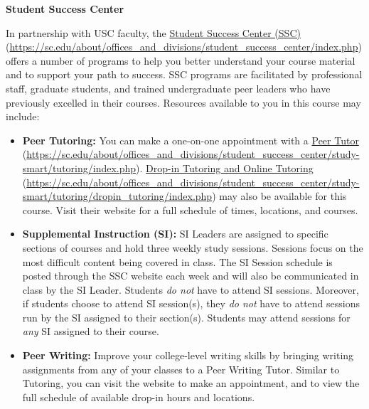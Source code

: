 \documentclass[11pt,letterpaper]{article}
\begin{document}
 \pvspace{0.1cm}

{\bfseries Student Success Center} \par
In partnership with USC faculty, the \href{https://sc.edu/about/offices\_and\_divisions/student\_success\_center/index.php}{Student Success Center (SSC)} (\url{https://sc.edu/about/offices\_and\_divisions/student\_success\_center/index.php}) offers a number of programs to help you better understand your course material and to support your path to success. SSC programs are facilitated by professional staff, graduate students, and trained undergraduate peer leaders who have previously excelled in their courses. Resources available to you in this course may include:
	\begin{itemize}
	\item {\bfseries Peer Tutoring:} You can make a one-on-one appointment with a \href{https://sc.edu/about/offices\_and\_divisions/student\_success\_center/study-smart/tutoring/index.php}{Peer Tutor} (\url{https://sc.edu/about/offices\_and\_divisions/student\_success\_center/study-smart/tutoring/index.php}). 
	\href{https://sc.edu/about/offices\_and\_divisions/student\_success\_center/study-smart/tutoring/dropin\_tutoring/index.php}{Drop-in Tutoring and Online Tutoring} (\url{https://sc.edu/about/offices\_and\_divisions/student\_success\_center/study-smart/tutoring/dropin\_tutoring/index.php}) may also be available for this course. Visit their website for a full schedule of times, locations, and courses.
	\item {\bfseries Supplemental Instruction (SI):} SI Leaders are assigned to specific sections of courses and hold three weekly study sessions. Sessions focus on the most difficult content being covered in class. The SI Session schedule is posted through the SSC website each week and will also be communicated in class by the SI Leader. Students \textit{do not} have to attend SI sessions. Moreover, if students choose to attend SI session(s), they \textit{do not} have to attend sessions run by the SI assigned to their section(s). Students may attend sessions for \textit{any} SI assigned to their course.
	\item {\bfseries Peer Writing:} Improve your college-level writing skills by bringing writing assignments from any of your classes to a Peer Writing Tutor. Similar to Tutoring, you can visit the website to make an appointment, and to view the full schedule of available drop-in hours and locations.

\end{itemize}
\end{document}

